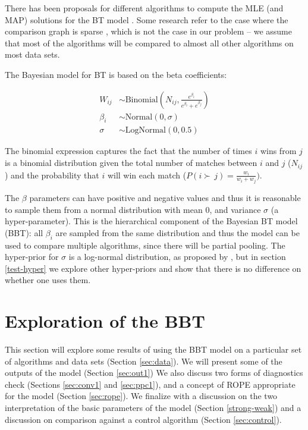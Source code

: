 \documentclass[twoside,11pt,preprint]{article}
\begin{document}
There has been proposals for different algorithms to compute the MLE
(and MAP) solutions for the BT model
\citep{hunter2004mm, caron2012efficient}. Some research refer to the
case where the comparison graph is sparse \citep{li2021, butler2004},
which is not the case in our problem -- we assume that most of the
algorithms will be compared to almost all other algorithms on most
data sets.

The Bayesian model for BT is based on the beta coefficients:

\begin{align} 
 W_{ij} &\sim \mbox{Binomial}(N_{ij}, \frac{e^{\beta_i}}{e^{\beta_i} +  e^{\beta_j}}) \label{eq:mod1} \\
 \beta_i &\sim \mbox{Normal}(0,\sigma) \nonumber \\
 \sigma &\sim \mbox{LogNormal}(0,0.5) \nonumber
\end{align}

The binomial expression captures the fact that the number of times \(i\)
wins from \(j\) is a binomial distribution given the total number of
matches between \(i\) and \(j\) (\(N_{ij}\)) and the probability that \(i\)
will win each match (\(P(i \succ\,j) = \frac{w_i}{w_i+ w_j})\).

The \(\beta\) parameters can have positive and negative values and thus
it is reasonable to sample them from a normal distribution with mean
0, and variance \(\sigma\) (a hyper-parameter). This is the
hierarchical component of the Bayesian BT model (BBT): all \(\beta_i\)
are sampled from the same distribution and thus the model can be used
to compare multiple algorithms, since there will be partial pooling.
The hyper-prior for \(\sigma\) is a log-normal distribution, as proposed
by \citet{btstan}, but in section \ref{test-hyper} we explore other
hyper-priors and show that there is no difference on whether one uses
them.

\hypertarget{exploration-of-the-bbt}{%
\section{\texorpdfstring{Exploration of the BBT \label{sec:exp1}}{Exploration of the BBT }}\label{exploration-of-the-bbt}}

This section will explore some results of using the BBT model on a
particular set of algorithms and data sets (Section
\ref{sec:data}). We will present some of the outputs of the model
(Section \ref{sec:out1}) We also discuss two forms of diagnostics
check (Sections \ref{sec:conv1} and \ref{sec:ppc1}), and a concept of
ROPE appropriate for the model (Section \ref{sec:rope}). We finalize
with a discussion on the two interpretation of the basic parameters of
the model (Section \ref{strong-weak}) and a discussion on comparison
against a control algorithm (Section \ref{sec:control}).
\end{document}
